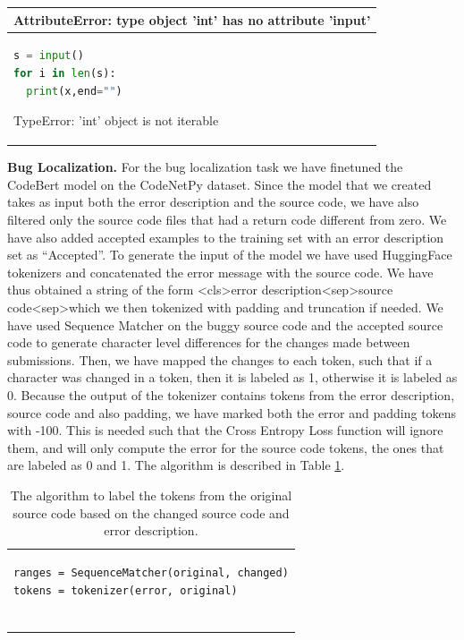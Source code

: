 \documentclass[12pt,a4paper]{report}
\begin{document}
\begin{appendices}
\begin{table}[H]
\begin{tabular}{p{15cm}}
AttributeError: type object 'int' has no attribute 'input'
\\

\hline
\begin{lstlisting}[language=Python]
s = input()
for i in len(s):
  print(x,end="")
\end{lstlisting}

TypeError: 'int' object is not iterable
\\
\end{tabular}
\end{table}

\textbf{Bug Localization.} For the bug localization task we have finetuned the CodeBert model on the CodeNetPy dataset. Since the model that we created takes as input both the error description and the source code, we have also filtered only the source code files that had a return code different from zero. We have also added accepted examples to the training set with an error description set as “Accepted”. To generate the input of the model we have used HuggingFace tokenizers and concatenated the error message with the source code. We have thus obtained a string of the form \textless{cls}\textgreater error description\textless{sep}\textgreater source code\textless{sep}\textgreater which we then tokenized with padding and truncation if needed. We have used Sequence Matcher on the buggy source code and the accepted source code to generate character level differences for the changes made between submissions. Then, we have mapped the changes to each token, such that if a character was changed in a token, then it is labeled as 1, otherwise it is labeled as 0. Because the output of the tokenizer contains tokens from the error description, source code and also padding, we have marked both the error and padding tokens with -100. This is needed such that the Cross Entropy Loss function will ignore them, and will only compute the error for the source code tokens, the ones that are labeled as 0 and 1. The algorithm is described in Table \ref{tab:experiments13}.

\begin{table}[H]\small\linespread{1}
\centering
\caption{The algorithm to label the tokens from the original source code based on the changed source code and error description.}
\label{tab:experiments13}
\begin{tabular}{p{10cm}}
\begin{lstlisting}
ranges = SequenceMatcher(original, changed)
tokens = tokenizer(error, original)


\end{lstlisting}
\end{tabular}
\end{table}
\end{appendices}
\end{document}
